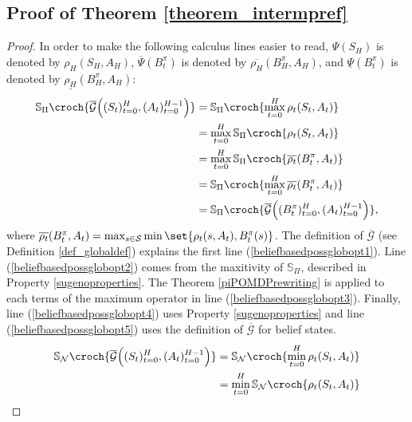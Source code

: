 \subsection{Proof of Theorem \ref{theorem_intermpref}}
\label{theorem_intermpref_RETURN}
\begin{proof}
In order to make the following calculus lines easier to read,
$\Psi(S_H)$ is denoted by $\rho_H(S_H,A_H)$,
$\overline{\Psi}(B^{\pi}_t)$ is denoted by $\overline{\rho_H}(B^{\pi}_H,A_H)$,
and $\underline{\Psi}(B^{\pi}_t)$ is denoted by $\underline{\rho_H}(B^{\pi}_H,A_H)$:
\begin{align}
\label{beliefbasedpossglobopt1} \mathbb{S}_{\Pi} \croch{  \overline{\mathcal{G}} \Big( (S_t)_{t=0}^{H}, (A_t)_{t=0}^{H-1} \Big) } 
 &= \mathbb{S}_{\Pi} \croch{  \max_{t=0}^{H} \rho_t (S_t, A_t) } \\
\label{beliefbasedpossglobopt2} &= \max_{t=0}^{H} \mathbb{S}_{\Pi} \croch{ \rho_t (S_t, A_t) } \\
\label{beliefbasedpossglobopt3} &= \max_{t=0}^{H} \mathbb{S}_{\Pi} \croch{ \overline{\rho_t} (B^{\pi}_t, A_t) } \\
\label{beliefbasedpossglobopt4} &=  \mathbb{S}_{\Pi} \croch{ \max_{t=0}^{H} \overline{\rho_t} (B^{\pi}_t, A_t) } \\
\label{beliefbasedpossglobopt5} &= \mathbb{S}_{\Pi} \croch{ \overline{\mathcal{G}} \Big( (B^{\pi}_t)_{t=0}^{H},  (A_t)_{t=0}^{H-1} \Big) },
\end{align}
where $\overline{\rho_t}(B^{\pi}_t,A_t) = \max_{s \in \mathcal{S}} \min \set{ \rho_t(s,A_t), B^{\pi}_t(s) }$.
The definition of $\overline{\mathcal{G}}$ 
(see Definition \ref{def_globaldef})
explains the first line (\ref{beliefbasedpossglobopt1}).
Line (\ref{beliefbasedpossglobopt2}) 
comes from the maxitivity of $\mathbb{S}_{\Pi}$,
described in Property \ref{sugenoproperties}.
The Theorem \ref{piPOMDPrewriting} is applied to each
terms of the maximum operator in line (\ref{beliefbasedpossglobopt3}).
Finally, line (\ref{beliefbasedpossglobopt4}) uses Property \ref{sugenoproperties}
and line (\ref{beliefbasedpossglobopt5}) uses the definition of
$\overline{\mathcal{G}}$ for belief states.
\begin{align}
\label{beliefbasedpossglobpess1} \mathbb{S}_{\mathcal{N}} \croch{  \overline{\mathcal{G}} \Big( (S_t)_{t=0}^{H}, (A_t)_{t=0}^{H-1} \Big) } 
 &= \mathbb{S}_{\mathcal{N}} \croch{  \min_{t=0}^{H} \rho_t (S_t, A_t) } \\
\label{beliefbasedpossglobpess2} &= \min_{t=0}^{H} \mathbb{S}_{\mathcal{N}} \croch{ \rho_t (S_t, A_t) } \\

\end{align}
\end{proof}

